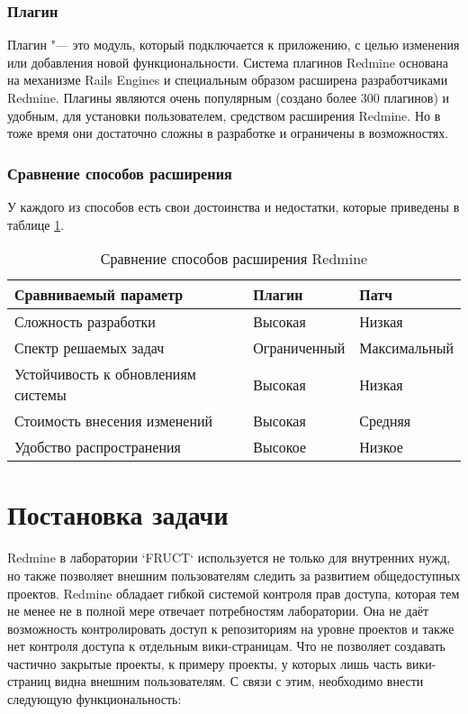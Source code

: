 \subsubsection{Плагин}
Плагин "--- это модуль, который подключается к приложению, с целью изменения
или добавления новой функциональности. Система плагинов Redmine основана на
механизме Rails Engines и специальным образом расширена разработчиками Redmine.
Плагины являются очень популярным (создано более 300 плагинов) и удобным,
для установки пользователем, средством расширения Redmine. Но в тоже время они
достаточно сложны в разработке и ограничены в возможностях.

\subsubsection{Сравнение способов расширения}
У каждого из способов есть свои достоинства и недостатки, которые приведены в
таблице \ref{comparing_extensions}.
\begin{table}[hb!]
\small
\centering
\begin{tabular}{ 
|>{\centering\arraybackslash}m{}
|>{\centering\arraybackslash}m{}
|>{\centering\arraybackslash}m{}|}
\hline
\textbf{Сравниваемый параметр} & \textbf{Плагин} & \textbf{Патч}\\
\hline
Сложность разработки & Высокая & Низкая \\
\hline
Спектр решаемых задач & Ограниченный & Максимальный\\
\hline
Устойчивость к обновлениям системы & Высокая & Низкая \\
\hline
Стоимость внесения изменений & Высокая & Средняя \\
\hline
Удобство распространения & Высокое & Низкое \\
\hline
\end{tabular}
\caption{Сравнение способов расширения Redmine}
\label{comparing_extensions}
\end{table}


\section{Постановка задачи}
Redmine в лаборатории `FRUCT` используется не только для внутренних нужд, но
также позволяет внешним пользователям следить за развитием общедоступных
проектов. Redmine обладает гибкой системой контроля прав доступа, которая тем
не менее не в полной мере отвечает потребностям лаборатории. Она не даёт
возможность контролировать доступ к репозиториям на уровне проектов и также нет
контроля доступа к отдельным вики-страницам. Что не позволяет создавать
частично закрытые проекты, к примеру проекты, у которых лишь часть вики-страниц
видна внешним пользователям. С связи с этим, необходимо внести следующую
функциональность:

